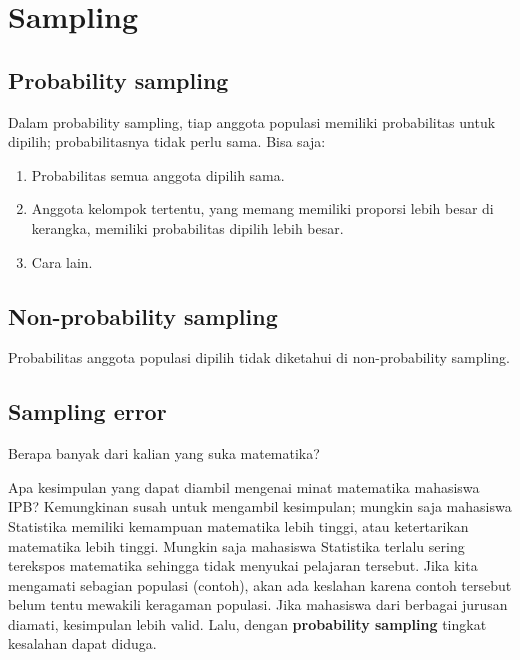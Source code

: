 \documentclass[
  letterpaper,
  DIV=11,
  numbers=noendperiod]{scrreprt}
\providecommand{\tightlist}{%
  \setlength{\itemsep}{0pt}\setlength{\parskip}{0pt}}\usepackage{longtable,booktabs,array}
\begin{document}
\hypertarget{sampling-1}{%
\section{Sampling}\label{sampling-1}}

\hypertarget{probability-sampling}{%
\subsection{Probability sampling}\label{probability-sampling}}

Dalam probability sampling, tiap anggota populasi memiliki probabilitas
untuk dipilih; probabilitasnya tidak perlu sama. Bisa saja:

\begin{enumerate}
\def\labelenumi{\arabic{enumi}.}
\tightlist
\item
  Probabilitas semua anggota dipilih sama.
\item
  Anggota kelompok tertentu, yang memang memiliki proporsi lebih besar
  di kerangka, memiliki probabilitas dipilih lebih besar.
\item
  Cara lain.
\end{enumerate}

\hypertarget{non-probability-sampling}{%
\subsection{Non-probability sampling}\label{non-probability-sampling}}

Probabilitas anggota populasi dipilih tidak diketahui di non-probability
sampling.

\hypertarget{sampling-error}{%
\subsection{Sampling error}\label{sampling-error}}

Berapa banyak dari kalian yang suka matematika?

Apa kesimpulan yang dapat diambil mengenai minat matematika mahasiswa
IPB? Kemungkinan susah untuk mengambil kesimpulan; mungkin saja
mahasiswa Statistika memiliki kemampuan matematika lebih tinggi, atau
ketertarikan matematika lebih tinggi. Mungkin saja mahasiswa Statistika
terlalu sering terekspos matematika sehingga tidak menyukai pelajaran
tersebut. Jika kita mengamati sebagian populasi (contoh), akan ada
keslahan karena contoh tersebut belum tentu mewakili keragaman populasi.
Jika mahasiswa dari berbagai jurusan diamati, kesimpulan lebih valid.
Lalu, dengan \textbf{probability sampling} tingkat kesalahan dapat
diduga.
\end{document}
